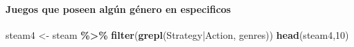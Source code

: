 \documentclass[
]{article}
\newenvironment{Shaded}{\begin{snugshade}}{\end{snugshade}}
\newcommand{\DecValTok}[1]{\textcolor[rgb]{0.00,0.00,0.81}{#1}}
\newcommand{\FunctionTok}[1]{\textcolor[rgb]{0.13,0.29,0.53}{\textbf{#1}}}
\newcommand{\NormalTok}[1]{#1}
\newcommand{\OtherTok}[1]{\textcolor[rgb]{0.56,0.35,0.01}{#1}}
\newcommand{\SpecialCharTok}[1]{\textcolor[rgb]{0.81,0.36,0.00}{\textbf{#1}}}
\newcommand{\StringTok}[1]{\textcolor[rgb]{0.31,0.60,0.02}{#1}}
\begin{document}
\hypertarget{juegos-que-poseen-alguxfan-guxe9nero-en-especificos}{%
\paragraph{Juegos que poseen algún género en
especificos}\label{juegos-que-poseen-alguxfan-guxe9nero-en-especificos}}

\begin{Shaded}
\begin{Highlighting}[]
\NormalTok{steam4 }\OtherTok{\textless{}{-}}\NormalTok{ steam }\SpecialCharTok{\%\textgreater{}\%} \FunctionTok{filter}\NormalTok{(}\FunctionTok{grepl}\NormalTok{(}\StringTok{\textquotesingle{}Strategy|Action\textquotesingle{}}\NormalTok{, genres))}
\FunctionTok{head}\NormalTok{(steam4,}\DecValTok{10}\NormalTok{)}
\end{Highlighting}
\end{Shaded}
\end{document}
